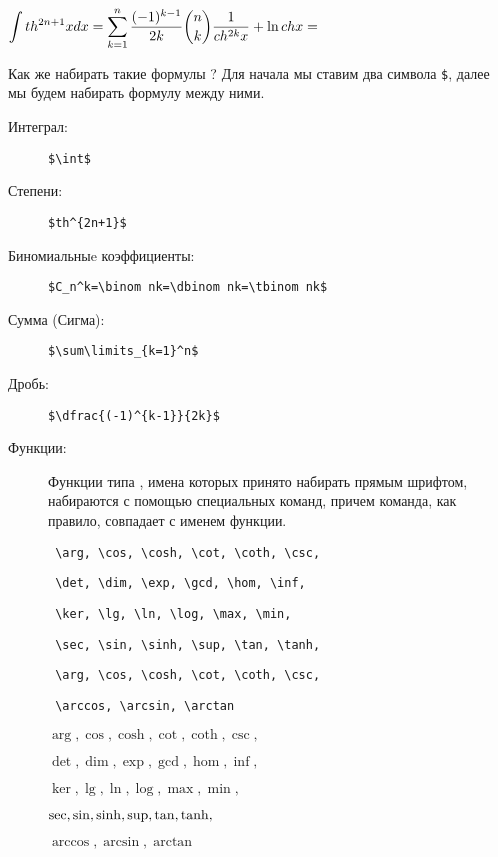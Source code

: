 \documentclass[a4paper,12pt]{article}
\begin{document}
$\displaystyle\int th^{2n+1}xdx=\sum\limits_{k=1}^n\dfrac{(-1)^{k-1}}{2k}\dbinom nk\dfrac{1}{ch^{2k}x}+\ln chx=$ 

Как же набирать такие формулы ? Для начала мы ставим два символа \texttt{\$}, далее мы будем набирать формулу между ними. 
\begin{description}
\item [Интеграл:] \verb|$\int$|
\hspace{1cm}{$\displaystyle\int$}
\item [Степени:] \verb|$th^{2n+1}$|
\item [Биномиальныe коэффициенты:] \verb|$C_n^k=\binom nk=\dbinom nk=\tbinom nk$|

\hspace{1cm}{$C_n^k=\binom nk=\dbinom nk=\tbinom nk$}
\item [Сумма (Сигма):] \verb|$\sum\limits_{k=1}^n$|
\item [Дробь:] \verb|$\dfrac{(-1)^{k-1}}{2k}$|
\item [Функции:] Функции типа , имена которых принято набирать прямым шрифтом, набираются с помощью специальных команд, причем команда, как правило, совпадает с именем функции. \cite{2}

\verb| \arg, \cos, \cosh, \cot, \coth, \csc,| 

\verb| \det, \dim, \exp, \gcd, \hom, \inf,| 

\verb| \ker, \lg, \ln, \log, \max, \min,| 

\verb| \sec, \sin, \sinh, \sup, \tan, \tanh,| 

\verb| \arg, \cos, \cosh, \cot, \coth, \csc,| 

\verb| \arccos, \arcsin, \arctan|

$\arg, \cos, \cosh, \cot, \coth, \csc,$

$\det, \dim, \exp, \gcd, \hom, \inf,$

$\ker, \lg, \ln, \log, \max, \min,$
 
$\sec, \sin, \sinh, \sup, \linebreak \tan, \tanh,$

$\arccos, \arcsin, \arctan
$


\end{description}
\end{document}
